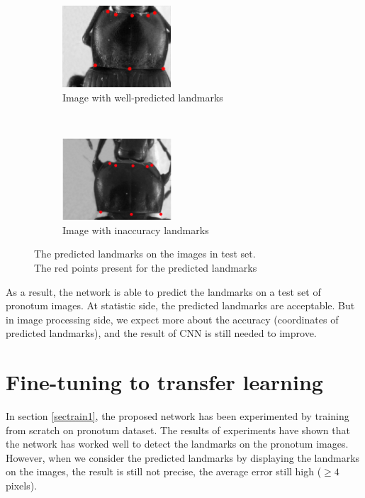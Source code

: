 \documentclass[10pt]{article}
\begin{document}
\begin{figure}[htbp]
    \centering
    \begin{subfigure}[t]{0.25\textwidth}
        \centering
        \includegraphics[height=1.2in]{images/fn_accuracy}
        \caption{\small{Image with well-predicted landmarks}}
        \label{figsub1}
    \end{subfigure}%
    ~ 
    \begin{subfigure}[t]{0.25\textwidth}
        \centering
        \includegraphics[height=1.2in]{images/plandmark2}
        \caption{\small{Image with inaccuracy landmarks}}
        \label{figsub2}
    \end{subfigure}
    \caption{\small{The predicted landmarks on the images in test set.\\
    		 The red points present for the predicted landmarks}}
    \label{figrsexample}
\end{figure}


As a result, the network is able to predict the landmarks on a test
set of pronotum images. At statistic side, the predicted landmarks are
acceptable. But in image processing side, we expect more about the
accuracy (coordinates of predicted landmarks), and the result of CNN
is still needed to improve.

\section{Fine-tuning to transfer learning}
\label{secimproving}
In section \ref{sectrain1}, the proposed network has been experimented
by training from scratch on pronotum dataset. The results of
experiments have shown that the network has worked well to detect the
landmarks on the pronotum images. However, when we consider the
predicted landmarks by displaying the landmarks on the images, the
result is still not precise, the average error still high ($\geq 4$
pixels).
\end{document}
